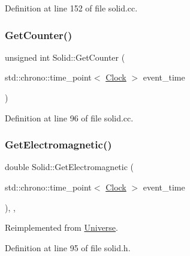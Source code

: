 Definition at line 152 of file solid.\+cc.

\mbox{\label{class_solid_a7ca41431033d05957f8be3f49c3aca23}} 
\subsubsection{\texorpdfstring{Get\+Counter()}{GetCounter()}}
{\footnotesize\ttfamily unsigned int Solid\+::\+Get\+Counter (\begin{DoxyParamCaption}\item[{std\+::chrono\+::time\+\_\+point$<$ \mbox{\hyperlink{universe_8h_a0ef8d951d1ca5ab3cfaf7ab4c7a6fd80}{Clock}} $>$}]{event\+\_\+time }\end{DoxyParamCaption})}



Definition at line 96 of file solid.\+cc.

\mbox{\label{class_solid_a01cd3c441a4e339927c43536de6d9b5e}} 
\subsubsection{\texorpdfstring{Get\+Electromagnetic()}{GetElectromagnetic()}}
{\footnotesize\ttfamily double Solid\+::\+Get\+Electromagnetic (\begin{DoxyParamCaption}\item[{std\+::chrono\+::time\+\_\+point$<$ \mbox{\hyperlink{universe_8h_a0ef8d951d1ca5ab3cfaf7ab4c7a6fd80}{Clock}} $>$}]{event\+\_\+time }\end{DoxyParamCaption})\hspace{0.3cm}{\ttfamily [inline]}, {\ttfamily [final]}, {\ttfamily [virtual]}}



Reimplemented from \mbox{\hyperlink{class_universe_a63b850ef3f3394313353109d222bf5d1}{Universe}}.



Definition at line 95 of file solid.\+h.

\mbox{\label{class_solid_aff7ec13bcc584d8330e3f3a1b371bbe6}} 
